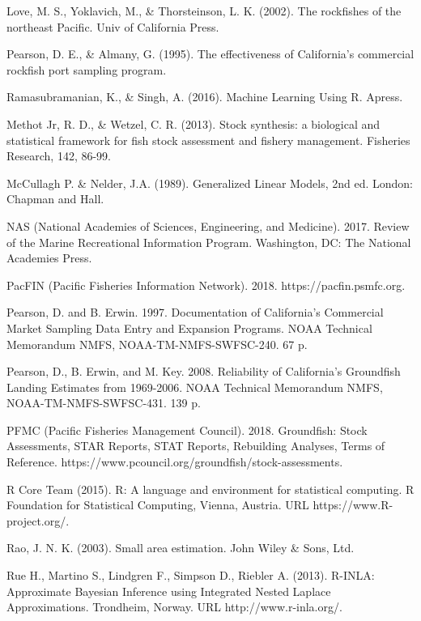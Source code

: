 \documentclass[12pt]{article}
\begin{document}
\begin{thebibliography}{1}
%
 Love, M. S., Yoklavich, M., \& Thorsteinson, L. K. (2002). The 
rockfishes of the northeast Pacific. Univ of California Press.

%
 Pearson, D. E., \& Almany, G. (1995). The effectiveness of 
California's commercial rockfish port sampling program.

%
 Ramasubramanian, K., \& Singh, A. (2016). Machine Learning 
Using R. Apress.

%
 Methot Jr, R. D., \& Wetzel, C. R. (2013). Stock synthesis: a 
biological and statistical framework for fish stock assessment and fishery 
management.  Fisheries Research, 142, 86-99.

%
 McCullagh P. \& Nelder, J.A. (1989). Generalized Linear 
Models, 2nd ed. London: Chapman and Hall.

%
 NAS (National Academies of Sciences, Engineering, and Medicine). 
2017. Review of the Marine Recreational Information Program. Washington, DC: 
The National Academies Press.

%
 PacFIN (Pacific Fisheries Information Network). 2018. 
https://pacfin.psmfc.org.

%
 Pearson, D. and B. Erwin. 1997. Documentation of 
California's Commercial Market Sampling Data Entry and Expansion Programs. 
NOAA Technical Memorandum NMFS, NOAA-TM-NMFS-SWFSC-240. 67 p.

%
Pearson, D., B. Erwin, and M. Key. 2008. Reliability 
of California's Groundfish Landing Estimates from 1969-2006. NOAA Technical 
Memorandum NMFS, NOAA-TM-NMFS-SWFSC-431. 139 p.

%
 PFMC (Pacific Fisheries Management Council). 2018. 
Groundfish: Stock Assessments, STAR Reports, STAT Reports, Rebuilding 
Analyses, Terms of Reference. https://www.pcouncil.org/groundfish/stock-assessments.

%
 R Core Team (2015). R: A language and environment for 
statistical computing. R Foundation for Statistical Computing, Vienna, 
Austria. URL https://www.R-project.org/.

%
 Rao, J. N. K. (2003). Small area estimation. John Wiley \& Sons, Ltd.

%
 Rue H., Martino S., Lindgren F., Simpson D., Riebler A. 
(2013). R-INLA: Approximate Bayesian Inference using Integrated Nested Laplace 
Approximations.  Trondheim, Norway. URL 
http://www.r-inla.org/.


\end{thebibliography}
\end{document}
